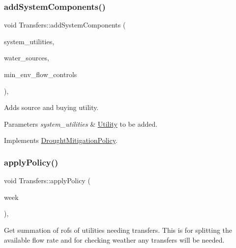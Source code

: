 \subsubsection{\texorpdfstring{add\+System\+Components()}{addSystemComponents()}}
{\footnotesize\ttfamily void Transfers\+::add\+System\+Components (\begin{DoxyParamCaption}\item[{vector$<$ \mbox{\hyperlink{classUtility}{Utility}} $\ast$$>$}]{system\+\_\+utilities,  }\item[{vector$<$ \mbox{\hyperlink{classWaterSource}{Water\+Source}} $\ast$$>$}]{water\+\_\+sources,  }\item[{vector$<$ \mbox{\hyperlink{classMinEnvFlowControl}{Min\+Env\+Flow\+Control}} $\ast$$>$}]{min\+\_\+env\+\_\+flow\+\_\+controls }\end{DoxyParamCaption})\hspace{0.3cm}{\ttfamily [override]}, {\ttfamily [virtual]}}

Adds source and buying utility. 
\begin{DoxyParams}{Parameters}
{\em system\+\_\+utilities} & \mbox{\hyperlink{classUtility}{Utility}} to be added. \\
\hline
\end{DoxyParams}


Implements \mbox{\hyperlink{classDroughtMitigationPolicy_aaab042a79d781afe8e08753b7012372a_aaab042a79d781afe8e08753b7012372a}{Drought\+Mitigation\+Policy}}.

\mbox{\label{classTransfers_ad9e4e83ff763ac1ba518a19051cd2e69_ad9e4e83ff763ac1ba518a19051cd2e69}} 
\subsubsection{\texorpdfstring{apply\+Policy()}{applyPolicy()}}
{\footnotesize\ttfamily void Transfers\+::apply\+Policy (\begin{DoxyParamCaption}\item[{int}]{week }\end{DoxyParamCaption})\hspace{0.3cm}{\ttfamily [override]}, {\ttfamily [virtual]}}

Get summation of rofs of utilities needing transfers. This is for splitting the available flow rate and for checking weather any transfers will be needed.

